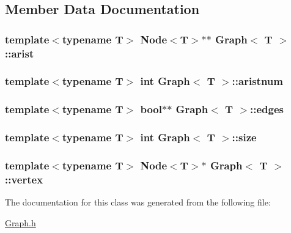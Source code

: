\subsection{Member Data Documentation}
\hypertarget{class_graph_aa4d188bead6f84478f1f809c09529195}{
\subsubsection[{arist}]{\setlength{\rightskip}{0pt plus 5cm}template$<$typename T$>$ {\bf Node}$<$T$>$$\ast$$\ast$ {\bf Graph}$<$ T $>$\+::arist}}\label{class_graph_aa4d188bead6f84478f1f809c09529195}
\hypertarget{class_graph_a5ac45f979baab5c953444780f03aca55}{
\subsubsection[{aristnum}]{\setlength{\rightskip}{0pt plus 5cm}template$<$typename T$>$ int {\bf Graph}$<$ T $>$\+::aristnum}}\label{class_graph_a5ac45f979baab5c953444780f03aca55}
\hypertarget{class_graph_a984840929138988e3fb622fffc6b22d1}{
\subsubsection[{edges}]{\setlength{\rightskip}{0pt plus 5cm}template$<$typename T$>$ bool$\ast$$\ast$ {\bf Graph}$<$ T $>$\+::edges}}\label{class_graph_a984840929138988e3fb622fffc6b22d1}
\hypertarget{class_graph_a592a0bf5252e291cac9beddc3ef0dce4}{
\subsubsection[{size}]{\setlength{\rightskip}{0pt plus 5cm}template$<$typename T$>$ int {\bf Graph}$<$ T $>$\+::size}}\label{class_graph_a592a0bf5252e291cac9beddc3ef0dce4}
\hypertarget{class_graph_a0f18c16458fe766ab6fff7c13b2c896e}{
\subsubsection[{vertex}]{\setlength{\rightskip}{0pt plus 5cm}template$<$typename T$>$ {\bf Node}$<$T$>$$\ast$ {\bf Graph}$<$ T $>$\+::vertex}}\label{class_graph_a0f18c16458fe766ab6fff7c13b2c896e}


The documentation for this class was generated from the following file\+:\begin{DoxyCompactItemize}
\item 
\hyperlink{_graph_8h}{Graph.\+h}\end{DoxyCompactItemize}
